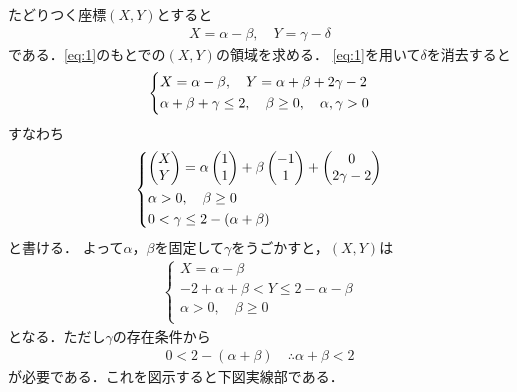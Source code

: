 \documentclass[../../main.tex]{subfiles}
\begin{document}
たどりつく座標$(X,Y)$とすると
\begin{align}
  X=\alpha-\beta, \quad Y=\gamma-\delta
\end{align}
である．\cref{eq:1}のもとでの$(X,Y)$の領域を求める．
\cref{eq:1}を用いて$\delta$を消去すると
\begin{align}
  \begin{dcases}
    X=\alpha-\beta, \quad Y=\alpha+\beta+2\gamma-2 \\
    \alpha+\beta+\gamma \le 2, \quad \beta \ge 0, \quad \alpha, \gamma > 0
  \end{dcases}
\end{align}
すなわち
\begin{align}
  \begin{dcases}
    \begin{pmatrix} X \\ Y
    \end{pmatrix}
    = \alpha
    \begin{pmatrix} 1 \\ 1
    \end{pmatrix}
    + \beta
    \begin{pmatrix} -1 \\ 1
    \end{pmatrix}
    +
    \begin{pmatrix} 0 \\ 2\gamma-2
    \end{pmatrix} \\
    \alpha > 0, \quad \beta \ge 0  \\
    0 < \gamma \le 2-(\alpha+\beta)
  \end{dcases}
\end{align}
と書ける．
よって$\alpha$，$\beta$を固定して$\gamma$をうごかすと，$(X,Y)$は
\begin{align}
  \begin{cases}
    X=\alpha-\beta \\
    -2+\alpha+\beta < Y \le 2-\alpha-\beta \\
    \alpha > 0, \quad \beta \ge 0 \\
  \end{cases} \label{eq:2}
\end{align}
となる．ただし$\gamma$の存在条件から
\begin{align}
  0 < 2-(\alpha+\beta)
  \quad\therefore
  \alpha+\beta < 2 \label{eq:3}
\end{align}
が必要である．これを図示すると下図実線部である．
\end{document}
